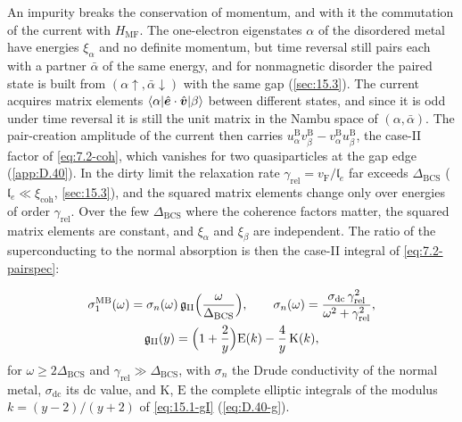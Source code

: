 An impurity breaks the conservation of momentum, and with it the commutation of the current with $H_{\mathrm{MF}}$. The one-electron eigenstates $\alpha$ of the disordered metal have energies $\xi_\alpha$ and no definite momentum, but time reversal still pairs each with a partner $\bar\alpha$ of the same energy, and for nonmagnetic disorder the paired state is built from $(\alpha\!\uparrow, \bar\alpha\!\downarrow)$ with the same gap (\cref{sec:15.3}). The current acquires matrix elements $\langle\alpha|\hat{\bm{e}}\cdot\hat{\bm{v}}|\beta\rangle$ between different states, and since it is odd under time reversal it is still the unit matrix in the Nambu space of $(\alpha, \bar\alpha)$. The pair-creation amplitude of the current then carries $u^{\mathrm{B}}_\alpha v^{\mathrm{B}}_\beta - v^{\mathrm{B}}_\alpha u^{\mathrm{B}}_\beta$, the case-II factor of \cref{eq:7.2-coh}, which vanishes for two quasiparticles at the gap edge (\cref{app:D.40}). In the dirty limit the relaxation rate $\gamma_{\mathrm{rel}} = v_{\mathrm{F}}/\mathfrak{l}_e$ far exceeds $\Delta_{\mathrm{BCS}}$ ($\mathfrak{l}_e \ll \xi_{\mathrm{coh}}$, \cref{sec:15.3}), and the squared matrix elements change only over energies of order $\gamma_{\mathrm{rel}}$. Over the few $\Delta_{\mathrm{BCS}}$ where the coherence factors matter, the squared matrix elements are constant, and $\xi_\alpha$ and $\xi_\beta$ are independent. The ratio of the superconducting to the normal absorption is then the case-II integral of \cref{eq:7.2-pairspec}:
\begin{keyresult}
\begin{equation}
  \begin{gathered}
  \sigma_1^{\mathrm{MB}}(\omega) = \sigma_n(\omega)\,\mathfrak{g}_{\mathrm{II}}\Bigl(\frac{\omega}{\Delta_{\mathrm{BCS}}}\Bigr), \qquad
  \sigma_n(\omega) = \frac{\sigma_{\mathrm{dc}}\,\gamma_{\mathrm{rel}}^2}{\omega^2 + \gamma_{\mathrm{rel}}^2} , \\
  \mathfrak{g}_{\mathrm{II}}(y) = \Bigl(1 + \frac2y\Bigr)\mathrm{E}(k) - \frac4y\,\mathrm{K}(k) ,
  \end{gathered}
  \label{eq:15.4-MB}
\end{equation}
for $\omega \ge 2\Delta_{\mathrm{BCS}}$ and $\gamma_{\mathrm{rel}} \gg \Delta_{\mathrm{BCS}}$, with $\sigma_n$ the Drude conductivity of the normal metal, $\sigma_{\mathrm{dc}}$ its dc value, and $\mathrm{K}$, $\mathrm{E}$ the complete elliptic integrals of the modulus $k = (y - 2)/(y + 2)$ of \cref{eq:15.1-gI} (\cref{eq:D.40-g}).
\end{keyresult}

